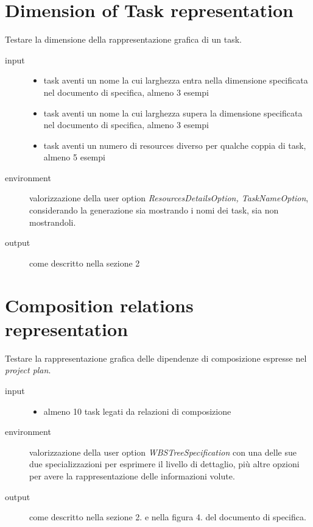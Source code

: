 \section{Dimension of Task representation}
Testare la dimensione della rappresentazione grafica di un task.
\begin{description}
\item[input] 
\quad
\begin{itemize}
  \item task aventi un nome la cui larghezza entra nella dimensione specificata
  nel documento di specifica, almeno 3 esempi
  \item task aventi un nome la cui larghezza supera la dimensione specificata
  nel documento di specifica, almeno 3 esempi
  \item task aventi un numero di resources diverso per qualche coppia di task,
  almeno 5 esempi
\end{itemize}
\item[environment] valorizzazione della user option
\emph{ResourcesDetailsOption, TaskNameOption}, considerando la generazione sia
mostrando i nomi dei task, sia non mostrandoli.
\item[output] come descritto nella sezione 2
\end{description}

\section{Composition relations representation}
Testare la rappresentazione grafica delle dipendenze di composizione espresse
nel \emph{project plan}.
\begin{description}
\item[input]  \quad
\begin{itemize}
  \item almeno 10 task legati da relazioni di composizione
\end{itemize}
\item[environment] valorizzazione della user option
\emph{WBSTreeSpecification} con una delle sue due specializzazioni per
esprimere il livello di dettaglio, pi\`u altre opzioni per avere la
rappresentazione delle informazioni volute.
\item[output] come descritto nella sezione 2. e nella figura 4. del
documento di specifica.
\end{description}

